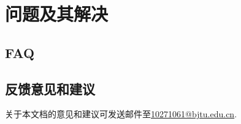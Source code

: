 \chapter{问题及其解决}
\section{FAQ}
\section{反馈意见和建议}
关于本文档的意见和建议可发送邮件至\href{mailto:10271061@bjtu.edu.cn}{10271061@bjtu.edu.cn}.
